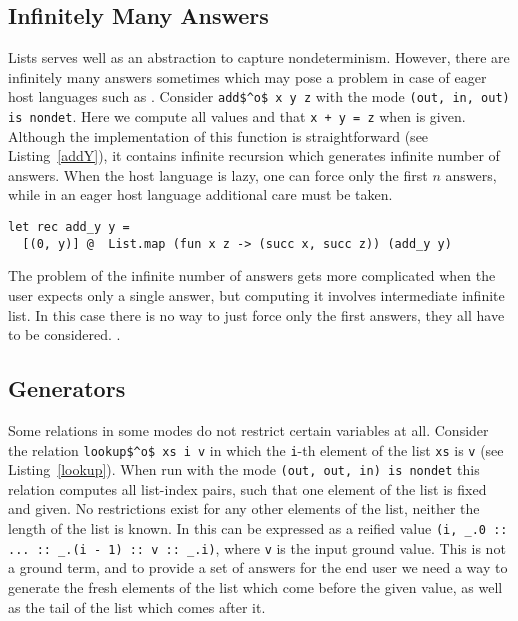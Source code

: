 \subsection{Infinitely Many Answers}

Lists serves well as an abstraction to capture nondeterminism.
However, there are infinitely many answers sometimes which may pose a problem in case of eager host languages such as \ocaml.
Consider \lstinline{add$^o$ x y z} with the mode \lstinline{(out, in, out) is nondet}.
Here we compute all values \x and \z that \lstinline{x + y = z} when \y is given.
Although the implementation of this function is straightforward (see Listing~\ref{addY}), it contains infinite recursion which generates infinite number of answers.
When the host language is lazy, one can force only the first $n$ answers, while in an eager host language additional care must be taken.

\begin{figure*}[!t]
  \centering
  \begin{minipage}{0.68\textwidth}
    \begin{lstlisting}[label={addY}, caption={Functional representation of \lstinline{addo x y z} with the mode \lstinline{(out, in, out) is nondet}}, captionpos=b, frame=tb]
let rec add_y y =
  [(0, y)] @  List.map (fun x z -> (succ x, succ z)) (add_y y)
    \end{lstlisting}
  \end{minipage}
\end{figure*}

The problem of the infinite number of answers gets more complicated when the user expects only a single answer, but computing it involves intermediate infinite list.
In this case there is no way to just force only the first answers, they all have to be considered. .

\subsection{Generators}

Some relations in some modes do not restrict certain variables at all.
Consider the relation \lstinline{lookup$^o$ xs i v} in which the \lstinline{i}-th element of the list \lstinline{xs} is \lstinline{v} (see Listing~\ref{lookup}).
When run with the mode \lstinline{(out, out, in) is nondet} this relation computes all list-index pairs, such that one element of the list is fixed and given.
No restrictions exist for any other elements of the list, neither the length of the list is known.
In \mk this can be expressed as a reified value \lstinline{(i, _.0 :: ... :: _.(i - 1) :: v :: _.i)}, where \lstinline{v} is the input ground value.
This is not a ground term, and to provide a set of answers for the end user we need a way to generate the fresh elements of the list which come before the given value, as well as the tail of the list which comes after it.

